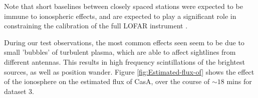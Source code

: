 \documentclass{aa}
\begin{document}
Note that  short baselines between closely  spaced stations were  expected to be
immune to  ionospheric effects, and are  expected to play a  significant role in
constraining    the     calibration    of    the     full    LOFAR    instrument
\citep{vdTol2007selfcallofar}.

During our  test observations, the  most common effects  seen seem to be  due to
small 'bubbles'  of turbulent plasma, which  are able to  affect sightlines from
different  antennas.  This  results  in  high frequency  scintillations  of  the
brightest     sources,     as    well     as     position    wander.      Figure
\ref{fig:Estimated-flux-of} shows the effect  of the ionosphere on the estimated
flux of CasA, over the course of $\sim18$ mins for dataset 3.

\begin{figure}[tbh]
\par

\end{figure}
\end{document}
